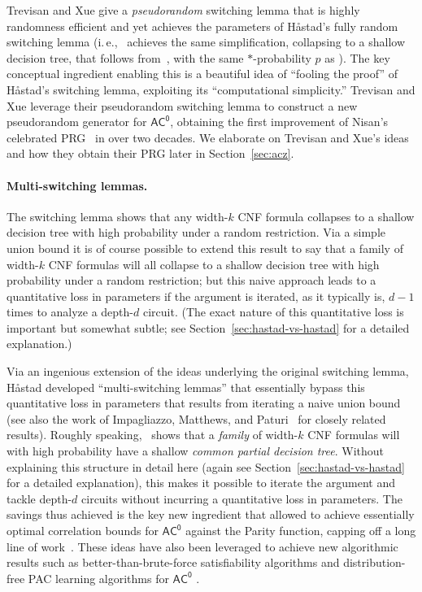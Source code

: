 \documentclass[11pt]{article}
\numberwithin{equation}{section}
\theoremstyle{definition}
\theoremstyle{plain}
\newcommand{\ie}{i.\,e.}
\theoremstyle{plain}
\newcommand{\acz}{\mathsf{AC^0}}
\begin{document}
Trevisan and Xue \cite{TX13} give a \emph{pseudorandom} switching lemma that is highly randomness efficient and yet achieves the parameters of H{\aa}stad's fully random switching lemma (\ie,~\cite{TX13} achieves the same simplification, collapsing to a shallow decision tree, that follows from~\cite{Hastad86}, with the same $\ast$-probability $p$ as \cite{Hastad86}).  The key conceptual ingredient enabling this is a beautiful idea of ``fooling the proof'' of  H{\aa}stad's switching lemma, exploiting its ``computational simplicity.''  Trevisan and Xue leverage their pseudorandom switching lemma to construct a new pseudorandom generator for $\acz$, obtaining the first improvement of Nisan's celebrated PRG~\cite{Nis91} in over two decades. We elaborate on Trevisan and Xue's ideas and how they obtain their PRG later in Section~\ref{sec:acz}.



\vspace{-5pt}
\paragraph{Multi-switching lemmas.}  The switching lemma shows that any width-$k$ CNF formula collapses to a shallow decision tree with high probability under a random restriction.  Via a simple union bound it is of course possible to extend this result to say that a family of width-$k$ CNF formulas will all collapse to a shallow decision tree with high probability under a random restriction; but this naive approach leads to a quantitative loss in parameters if the argument is iterated, as it typically is, $d-1$ times to analyze a depth-$d$ circuit.  (The exact nature of this quantitative loss is important but somewhat subtle; see Section~\ref{sec:hastad-vs-hastad} for a detailed explanation.)

Via an ingenious extension of the ideas underlying the original switching lemma, H{\aa}stad \cite{Has14} developed ``multi-switching lemmas'' that essentially bypass this quantitative loss in parameters that results from iterating a naive union bound (see also the work of Impagliazzo, Matthews, and Paturi~\cite{IMP12}  for closely related results).  Roughly speaking,~\cite{Has14} shows that a \emph{family} of width-$k$ CNF formulas will with high probability have a shallow \emph{common partial decision tree}.  Without explaining this structure in detail here (again see Section~\ref{sec:hastad-vs-hastad} for a detailed explanation), this makes it possible to iterate the argument and tackle depth-$d$ circuits without incurring a quantitative loss in parameters.  The savings thus achieved is the key new ingredient that allowed \cite{IMP12,Has14} to achieve essentially optimal correlation bounds for $\acz$ against the  {\sc Parity}  function, capping off a long line of work~\cite{ajtai1983,yao1985,Hastad86,Cai86,babai1987,BIS12}.  These ideas have also been leveraged to achieve new algorithmic results such as better-than-brute-force satisfiability algorithms and distribution-free PAC learning algorithms for $\acz$ \cite{BIS12,IMP12,STitcs17}.
\end{document}
